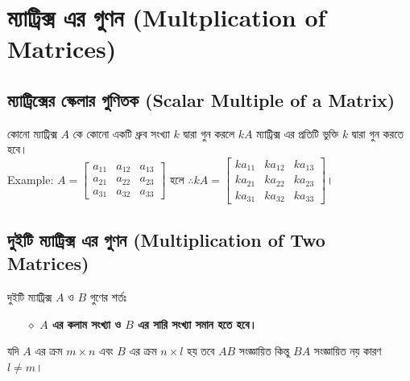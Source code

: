 \section{ম্যাট্রিক্স এর গুণন (Multplication of Matrices)}
\subsection{ম্যাট্রিক্সের স্কেলার গুণিতক (Scalar Multiple of a Matrix)}\label{section-5-1}
কোনো ম্যাট্রিক্স $A$ কে কোনো একটি ধ্রুব সংখ্যা $k$ দ্বারা গুন করলে $kA$ ম্যাট্রিক্স এর প্রতিটি ভুক্তি $k$ দ্বারা গুন করতে হবে।\\ Example: 
$A=\left[\begin{array}{ccc}
a_{11} & a_{12} & a_{13} \\
a_{21} & a_{22} & a_{23} \\
a_{31} & a_{32} & a_{33}
\end{array}\right]$ হলে 
$\therefore kA=\left[\begin{array}{ccc}
ka_{11} & ka_{12} & ka_{13} \\
ka_{21} & ka_{22} & ka_{23} \\
ka_{31} & ka_{32} & ka_{33}
\end{array}\right]$।
\subsection{দুইটি ম্যাট্রিক্স এর গুণন (Multiplication of Two Matrices)}
\begin{tcolorbox}
	দুইটি ম্যাট্রিক্স $A$ ও $B$ গুণের শর্তঃ
	\begin{itemize}
		\item[$\diamond$] \textbf{$A$ এর কলাম সংখ্যা ও $B$ এর সারি সংখ্যা সমান হতে হবে।}
	\end{itemize}
	যদি $A$ এর ক্রম $m\times n$ এবং $B$ এর ক্রম $n\times l$ হয় তবে $AB$ সংজ্ঞায়িত কিন্তু $BA$ সংজ্ঞায়িত নয় কারণ $l\neq m$।
\end{tcolorbox}

